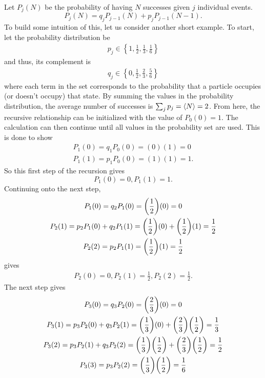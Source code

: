 Let $P_j(N)$ be the probability of having $N$ successes given $j$ individual events. 
\begin{equation*}
    P_j(N)=q_j P_{j-1}(N)+ p_j P_{j-1}(N-1). \label{pbrrshort}
\end{equation*} 
To build some intuition of this, let us consider another short example. To start, let the probability distribution be
\begin{gather}
    p_j\in \left\{1,\frac{1}{2},\frac{1}{3},\frac{1}{6}\right\}\nonumber
\end{gather}
and thus, its complement is
\begin{gather}
    q_j \in \left\{0,\frac{1}{2},\frac{2}{3},\frac{5}{6}\right\}\nonumber
\end{gather}
where each term in the set corresponds to the probability that a particle occupies (or doesn't occupy) that state. By summing the values in the probability distribution, the average number of successes is $\sum_j p_j=\left<{N}\right>=2$. From here, the recursive relationship can be initialized with the value of $P_0(0)=1$. The calculation can then continue until all values in the probability set are used. This is done to show
\begin{gather*}
    P_1(0)=q_1P_{0}(0)=(0)(1)=0\\
    P_1(1)=p_1 P_{0}(0)=(1)(1)=1.
\end{gather*}
So this first step of the recursion gives
\begin{equation*}
    P_1(0)=0, P_1(1)=1.
\end{equation*}
Continuing onto the next step,
\begin{gather*}
    P_1(0)=q_2 P_{1}(0)= \qty(\frac{1}{2})(0)=0\\
    P_2(1)=p_2 P_{1}(0)+q_2 P_{1}(1)=\qty(\frac{1}{2})(0)+\qty(\frac{1}{2})(1)=\frac{1}{2}\\
    P_2(2)=p_2 P_{1}(1)=\qty(\frac{1}{2})(1)=\frac{1}{2}
\end{gather*}
gives
\begin{gather*}
    P_2(0)=0, P_2(1)=\frac{1}{2}, P_2(2)=\frac{1}{2}.
\end{gather*}
The next step gives
\begin{gather*}
    P_3(0)=q_3 P_2(0)=\qty(\frac{2}{3})(0)=0\\
    P_3(1)=p_3 P_{2}(0)+q_3 P_{2}(1)=\qty(\frac{1}{3})(0)+\qty(\frac{2}{3})\qty(\frac{1}{2})=\frac{1}{3}\\
    P_3(2)=p_3 P_{2}(1)+q_3 P_{2}(2)=\qty(\frac{1}{3})\qty(\frac{1}{2})+\qty(\frac{2}{3})\qty(\frac{1}{2})=\frac{1}{2}\\
    P_3(3)=p_3 P_{2}(2)=\qty(\frac{1}{3})\qty(\frac{1}{2})=\frac{1}{6}\\
\end{gather*}
